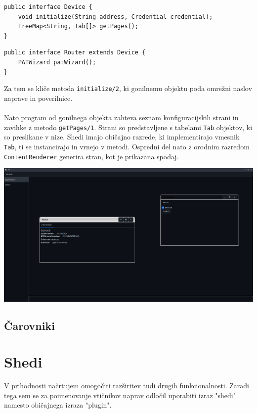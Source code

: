 \documentclass[12pt]{article}
\begin{document}
\begin{lstlisting}
public interface Device {
	void initialize(String address, Credential credential);
	TreeMap<String, Tab[]> getPages();
}
\end{lstlisting}

\begin{lstlisting}
public interface Router extends Device {
	PATWizard patWizard();
}
\end{lstlisting}
Za tem se kliče metoda \verb|initialize/2|, ki gonilnemu objektu poda
omrežni naslov naprave in poverilnice.
\\\\
Nato program od gonilnega objekta zahteva seznam konfiguracijskih strani
in zavihke z metodo \verb |getPages/1|. Strani so predstavljene s tabelami
\verb|Tab| objektov, ki so preslikane v nize. Shedi imajo običajno razrede,
ki implementirajo vmesnik \verb|Tab|, ti se instancirajo in vrnejo v
metodi. Ospredni del nato z orodnim razredom \verb|ContentRenderer|
generira stran, kot je prikazana spodaj.

\begin{center}
	\includegraphics[scale=0.28]{slike/config-window.png}
\end{center}
\newpage

\subsection{Čarovniki}
\newpage

\section{Shedi}
V prihodnosti načrtujem omogočiti razširitev tudi drugih funkcionalnosti.
Zaradi tega sem se za poimenovanje vtičnikov naprav odločil uporabiti
izraz "shedi" namesto običajnega izraza "plugin".
\end{document}
